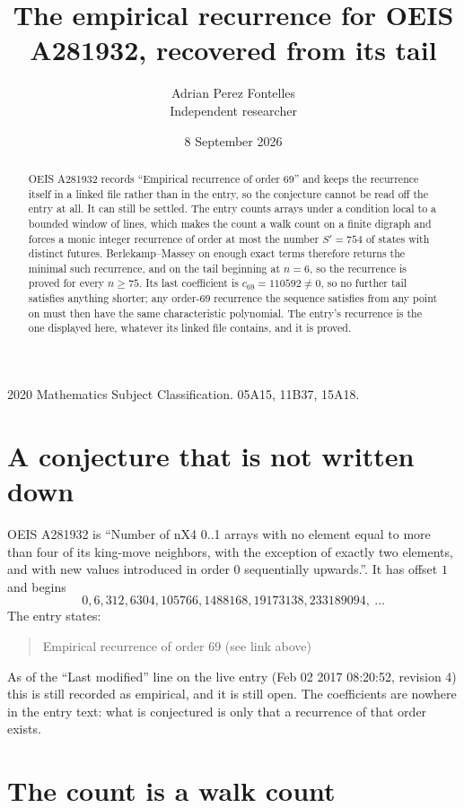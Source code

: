 \documentclass[11pt,a4paper]{article}
\title{The empirical recurrence for OEIS A281932, recovered from its tail}
\author{Adrian Perez Fontelles\\ \small Independent researcher}
\date{8 September 2026}
\theoremstyle{plain}
\theoremstyle{definition}
\begin{document}
\maketitle

\begin{abstract}
OEIS A281932 records ``Empirical recurrence of order $69$'' and keeps the recurrence itself in
a linked file rather than in the entry, so the conjecture cannot be read off the entry at all.
It can still be settled. The entry counts arrays under a condition local to a bounded window of
lines, which makes the count a walk count on a finite digraph and forces a monic integer
recurrence of order at most the number $S'=754$ of states with distinct futures. Berlekamp--Massey on
enough exact terms therefore returns the minimal such recurrence, and on the tail beginning at $n=6$, so the recurrence is proved for every $n\ge75$.
Its last coefficient is $c_{69}=110592\neq0$, so no further tail satisfies anything
shorter; any order-$69$ recurrence the sequence satisfies from any point on must then have
the same characteristic polynomial. The entry's recurrence is the one displayed here, whatever
its linked file contains, and it is proved.
\end{abstract}

\noindent\small 2020 Mathematics Subject Classification. 05A15, 11B37, 15A18.\normalsize

\section{A conjecture that is not written down}

OEIS A281932 is ``Number of nX4 0..1 arrays with no element equal to more than four of its king-move neighbors, with the exception of exactly two elements, and with new values introduced in order 0 sequentially upwards.''. It has offset $1$ and begins
\[
0, 6, 312, 6304, 105766, 1488168, 19173138, 233189094,\ \dots
\]
The entry states:
\begin{quote}
Empirical recurrence of order 69 (see link above)
\end{quote}
As of the ``Last modified'' line on the live entry (Feb 02 2017 08:20:52, revision 4)
this is still recorded as empirical, and it is still open. The coefficients are nowhere in the
entry text: what is conjectured is only that a recurrence of that order exists.

\section{The count is a walk count}
\end{document}
